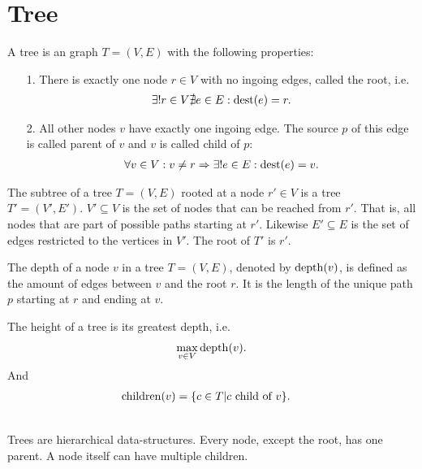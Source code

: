 \section{Tree}
	\begin{mydef}\label{tree}
		A \textnormal{tree} is an graph $T = (V, E)$ with the following properties:
		\begin{itemize}
			\item[1.] There is exactly one node $r \in V$ with no ingoing edges, called the \textnormal{root}, i.e.
				\begin{align*}
					\exists! r \in V \nexists e \in E : \operatorname{dest}(e) = r.
				\end{align*}
			\item[2.] All other nodes $v$ have exactly one ingoing edge. The source $p$ of this edge is called \textnormal{parent} of $v$ and
				$v$ is called \textnormal{child} of $p$:
				\begin{align*}
					\forall v \in V : v \neq r \Rightarrow \exists! e \in E : \operatorname{dest}(e) = v.
				\end{align*}
		\end{itemize}
	\end{mydef}
	\begin{mydef}\label{subTree}
		The \textnormal{subtree} of a tree $T = (V, E)$ rooted at a node $r' \in V$ is a tree $T' = (V', E')$. $V' \subseteq V$ is the set
		of nodes that can be reached from $r'$. That is, all nodes that are part of possible paths starting at $r'$.
		Likewise $E' \subseteq E$ is the set of edges restricted to the vertices in $V'$. The root of $T'$ is $r'$.
	\end{mydef}
	\begin{mydef}\label{treeDepth}
		The \textnormal{depth} of a node $v$ in a tree $T = (V, E)$, denoted by $\operatorname{depth}(v)$, is defined as the amount of
		edges between $v$ and the root $r$. It is the length of the unique path $p$ starting at $r$ and ending at $v$.
		
		The \textnormal{height} of a tree is its greatest depth, i.e.
		\begin{align*}
			\max_{v \in V} \operatorname{depth}(v).
		\end{align*}
		And
		\begin{align*}
			\operatorname{children}(v)	&= \{c \in T | c \text{ child of } v\}.
		\end{align*}
	\end{mydef}\quad\\
	Trees are hierarchical data-structures. Every node, except the root, has one parent. A node itself can have multiple children.
